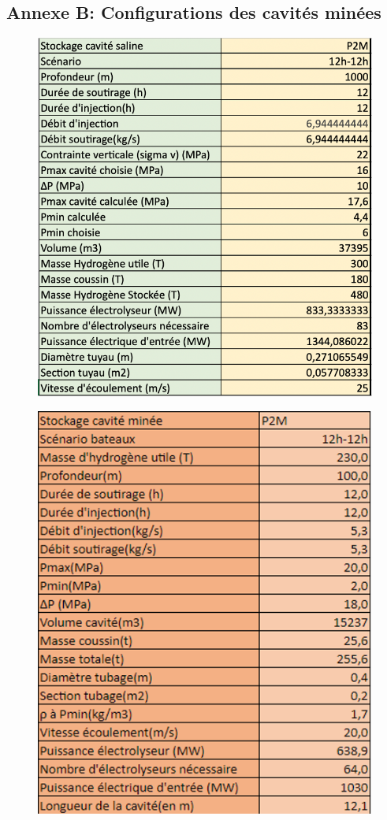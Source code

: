 \documentclass[11pt,french,a4paper]{article}
\begin{document}
\FloatBarrier
\subsection*{Annexe B: Configurations des cavités minées} 

\begin{figure}
\centering
\begin{minipage}{.5\textwidth}
  \centering
  \includegraphics[width=0.8\linewidth]{image/annexe/config_cavite_minee/c1.png}
  \label{fig:test1}
\end{minipage}%
\begin{minipage}{.5\textwidth}
  \centering
  \includegraphics[width=0.7\linewidth]{image/annexe/config_cavite_minee/c2.png}
  \label{fig:test2}
\end{minipage}
\end{figure}
\end{document}
